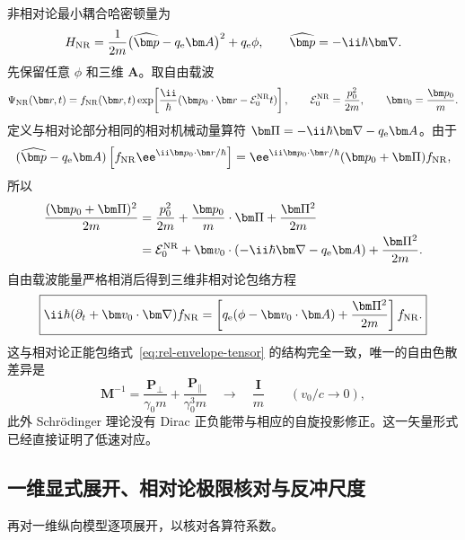 非相对论最小耦合哈密顿量为
\begin{equation}
H_{\rm NR}
=\frac{1}{2m}\bigl(\widehat{\bm p}-q_{\rm e}\bm A\bigr)^2+q_{\rm e}\phi,
\qquad
\widehat{\bm p}=-\ii\hbar\bm\nabla.
\label{eq:nr-hamiltonian}
\end{equation}
先保留任意 $\phi$ 和三维 $\bm A$。取自由载波
\begin{equation}
\Psi_{\rm NR}(\bm r,t)
=f_{\rm NR}(\bm r,t)
\exp\!\left[\frac{\ii}{\hbar}(\bm p_0\cdot\bm r-\mathcal E_0^{\rm NR}t)\right],
\qquad
\mathcal E_0^{\rm NR}=\frac{p_0^2}{2m},
\qquad
\bm v_0=\frac{\bm p_0}{m}.
\label{eq:nr-vector-carrier}
\end{equation}
定义与相对论部分相同的相对机械动量算符
\(
\bm\Pi=-\ii\hbar\bm\nabla-q_{\rm e}\bm A
\)。由于
\begin{equation}
(\widehat{\bm p}-q_{\rm e}\bm A)
\left[f_{\rm NR}\ee^{\ii\bm p_0\cdot\bm r/\hbar}\right]
=\ee^{\ii\bm p_0\cdot\bm r/\hbar}
(\bm p_0+\bm\Pi)f_{\rm NR},
\end{equation}
所以
\begin{align}
\frac{(\bm p_0+\bm\Pi)^2}{2m}
&=\frac{p_0^2}{2m}
+\frac{\bm p_0}{m}\cdot\bm\Pi
+\frac{\bm\Pi^2}{2m}\notag\\
&=\mathcal E_0^{\rm NR}
+\bm v_0\cdot(-\ii\hbar\bm\nabla-q_{\rm e}\bm A)
+\frac{\bm\Pi^2}{2m}.
\end{align}
自由载波能量严格相消后得到三维非相对论包络方程
\begin{equation}
\boxed{
\ii\hbar(\partial_t+\bm v_0\cdot\bm\nabla)f_{\rm NR}
=\left[
q_{\rm e}(\phi-\bm v_0\cdot\bm A)
+\frac{\bm\Pi^2}{2m}
\right]f_{\rm NR}.}
\label{eq:nr-envelope-vector}
\end{equation}
这与相对论正能包络式~\eqref{eq:rel-envelope-tensor} 的结构完全一致，唯一的自由色散差异是
\begin{equation}
\bm M^{-1}
=\frac{\bm P_\perp}{\gamma_0m}
+\frac{\bm P_\parallel}{\gamma_0^3m}
\quad\longrightarrow\quad
\frac{\bm I}{m}
\qquad(v_0/c\to0),
\label{eq:mass-tensor-low-speed}
\end{equation}
此外 Schr\"odinger 理论没有 Dirac 正负能带与相应的自旋投影修正。这一矢量形式已经直接证明了低速对应。

\subsection{一维显式展开、相对论极限核对与反冲尺度}

再对一维纵向模型逐项展开，以核对各算符系数。

